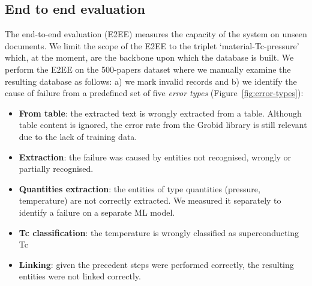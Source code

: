 \documentclass[]{interact}
\theoremstyle{plain}%
\theoremstyle{definition}
\theoremstyle{remark}
\begin{document}


\subsection{End to end evaluation}

The end-to-end evaluation (E2EE) measures the capacity of the system on unseen documents.
We limit the scope of the E2EE to the triplet `material-Tc-pressure' which, at the moment, are the backbone upon which the database is built.
We perform the E2EE on the 500-papers dataset where we manually examine the resulting database as follows: a) we mark invalid records and b) we identify the cause of failure from a predefined set of five \textit{error types} (Figure~\ref{fig:error-types}):  
\begin{itemize}
    \item \textbf{From table}: the extracted text is wrongly extracted from a table. Although table content is ignored, the error rate from the Grobid library is still relevant due to the lack of training data. 
    \item \textbf{Extraction}: the failure was caused by entities not recognised, wrongly or partially recognised.
    \item \textbf{Quantities extraction}: the entities of type quantities (pressure, temperature) are not correctly extracted. We measured it separately to identify a failure on a separate ML model.  
    \item \textbf{Tc classification}: the temperature is wrongly classified as superconducting Tc
    \item \textbf{Linking}: given the precedent steps were performed correctly, the resulting entities were not linked correctly. 
\end{itemize}
\end{document}
